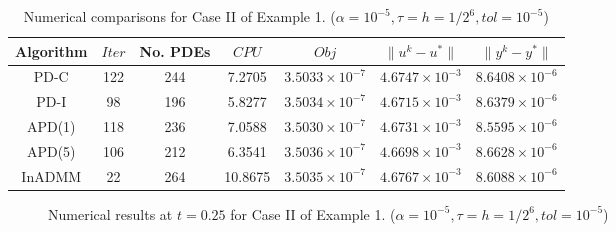 \documentclass[final]{siamart171218}
\theoremstyle{remark}
\begin{document}
\begin{table}[htpb]
	\centering
	\caption{Numerical comparisons for Case II of Example 1. ($\alpha=10^{-5}, \tau=h={1}/{2^6}, tol=10^{-5}$)}\label{result_case2_ex1}
	{\footnotesize
		\begin{tabular}{|c|c|c|c|c|c|c|}
			\hline
			Algorithm&$Iter$&No. PDEs&$CPU$&$Obj$&$\|u^k-u^*\|$&$\|y^k-y^*\|$\\
			\hline
			PD-C&122&244 &7.2705 &$3.5033\times 10^{-7}$ &$4.6747\times 10^{-3}$ &$8.6408\times 10^{-6}$\\
			\hline
			PD-I& 98&196 &5.8277&$3.5034\times 10^{-7}$ &$4.6715\times 10^{-3}$ &$8.6379\times 10^{-6}$\\
			\hline
			{APD}(1)& 118&236&7.0588&$3.5030\times 10^{-7}$ &$4.6731\times 10^{-3}$ &$8.5595\times 10^{-6}$\\
			\hline
			{APD}(5)& 106&212 &6.3541&$3.5036\times 10^{-7}$ &$4.6698\times 10^{-3}$ &$8.6628\times 10^{-6}$\\
			\hline
			{InADMM}& 22&264 &10.8675&$3.5035\times 10^{-7}$ &$4.6767\times 10^{-3}$ &$8.6088\times 10^{-6}$\\
			\hline
		\end{tabular}
	}
\end{table}

\begin{figure}[h!]
	\caption{Numerical results at $t=0.25$ for Case II of Example 1. ($\alpha=10^{-5}, \tau=h={1}/{2^6}, tol=10^{-5}$)}\label{numerical_results2_ex1}
	\centering
\end{figure}
\end{document}
